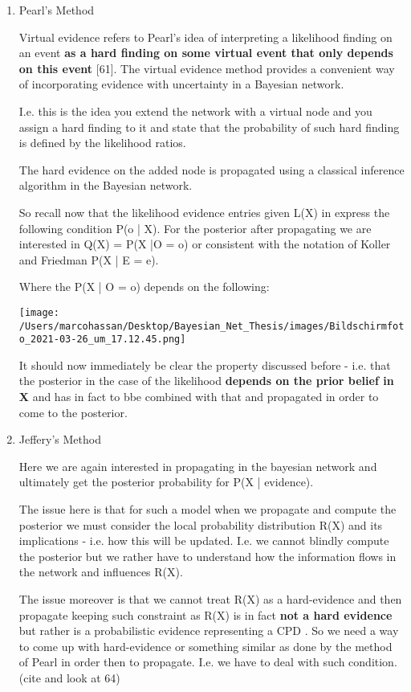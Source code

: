 \documentclass[a4paper]{article}
\begin{document}
\begin{enumerate}
\item Pearl's Method
\label{sec:orgcbe4e73}

Virtual evidence refers to Pearl’s idea of interpreting a
likelihood finding on an event \textbf{as a hard finding on some virtual
event that only depends on this event} [61]. The virtual evidence
method provides a convenient way of incorporating evidence with
uncertainty in a Bayesian network.

I.e. this is the idea you extend the network with a virtual node
and you assign a hard finding to it and state that the
probability of such hard finding is defined by the likelihood
ratios.

The hard evidence on the added node is propagated using a
classical inference algorithm in the Bayesian network.

So recall now that the likelihood evidence entries given L(X) in
express the following condition P(o | X). For the posterior after
propagating we are interested in Q(X) = P(X |O = o) or consistent
with the notation of Koller and Friedman P(X | E = e).

Where the P(X | O = o) depends on the following:

\begin{center}
\texttt{[image: /Users/marcohassan/Desktop/Bayesian\_Net\_Thesis/images/Bildschirmfoto\_2021-03-26\_um\_17.12.45.png]}
\end{center}

It should now immediately be clear the property discussed
before - i.e. that the posterior in the case of the likelihood
\textbf{depends on the prior belief in X} and has in fact to bbe
combined with that and propagated in order to come to the
posterior.

\item Jeffery's Method
\label{sec:org2fd954c}

Here we are again interested in propagating in the bayesian
network and ultimately get the posterior probability for P(X |
evidence).

The issue here is that for such a model when we propagate and
compute the posterior we must consider the local probability
distribution R(X) and its implications - i.e. how this will be
updated. I.e. we cannot blindly compute the posterior but we
rather have to understand how the information flows in the
network and influences R(X). 


The issue moreover is that we cannot treat R(X) as a
hard-evidence and then propagate keeping such constraint as R(X)
is in fact \textbf{not a hard evidence} but rather is a probabilistic
evidence representing a CPD . So we need a way to come up with
hard-evidence or something similar as done by the method of
Pearl in order then to propagate. I.e. we have to deal with such
condition. (cite and look at 64)


\end{enumerate}
\end{document}
